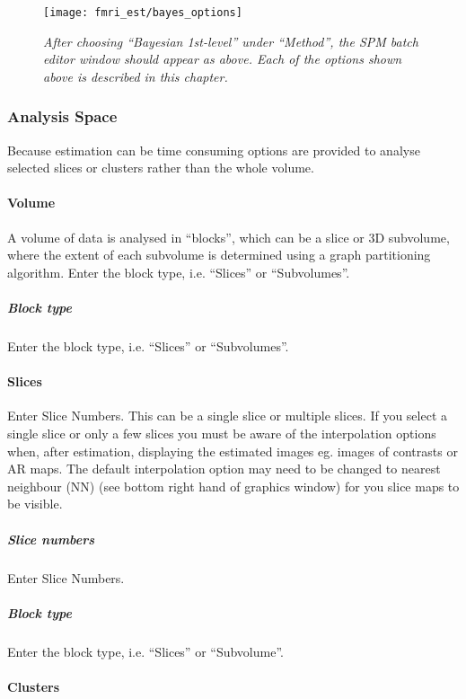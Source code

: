 \begin{figure}
\begin{center}
\texttt{[image: fmri\_est/bayes\_options]}
\end{center}
\caption{\em After choosing ``Bayesian 1st-level'' under ``Method'', the SPM batch editor window should appear as above. Each of the options shown above is described in this chapter. \label{bayes_options}}
\end{figure}

\subsubsection{Analysis Space}

Because estimation can be time consuming options are provided to analyse selected slices or clusters rather than the whole volume.

\paragraph{Volume}

A volume of data is analysed in ``blocks'', which can be a slice or 3D subvolume, where the extent of each subvolume is determined using a graph partitioning algorithm. Enter the block type, i.e. ``Slices'' or ``Subvolumes''.

\subparagraph{Block type}

Enter the block type, i.e. ``Slices'' or ``Subvolumes''.

\paragraph{Slices}

Enter Slice Numbers. This can be a single slice or multiple slices. If you select a single slice or only a few slices you must be aware of the interpolation options when, after estimation, displaying the estimated images eg. images of contrasts or AR maps. The default interpolation option may need to be changed to nearest neighbour (NN) (see bottom right hand of graphics window) for you slice maps to be visible.

\subparagraph{Slice numbers}

Enter Slice Numbers.

\subparagraph{Block type}

Enter the block type, i.e. ``Slices'' or ``Subvolume''.

\paragraph{Clusters}


